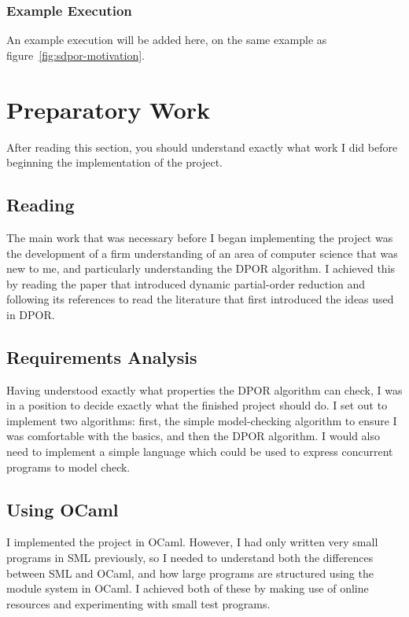 \documentclass[12pt,a4paper,twoside,openright]{report}
\begin{document}
\subsubsection{Example Execution}
An example execution will be added here, on the same example as
figure~\ref{fig:sdpor-motivation}.

\section{Preparatory Work}
After reading this section, you
should understand exactly what work I
did before beginning the implementation
of the project.

\subsection{Reading}

The main work that was necessary before
I began implementing the project was the
development of a firm understanding of an
area of computer science that was new to me,
and particularly understanding the DPOR algorithm.
I achieved this by reading the paper that
introduced dynamic partial-order reduction \cite{flan05}
and following
its references to read the literature that
first introduced the ideas used in DPOR.

\subsection{Requirements Analysis}
Having
understood exactly what properties the
DPOR algorithm can check, I was in a
position to decide exactly what the
finished project should do.
I set out to implement two algorithms:
first, the simple model-checking
algorithm to ensure I was comfortable
with the basics, and then the DPOR
algorithm. I would also need to
implement a simple language which
could be used to express concurrent
programs to model check.

\subsection{Using OCaml}
I implemented the project in OCaml.
However, I had only written very small
programs in SML previously, so I needed to
understand both the differences between
SML and OCaml, and how large programs
are structured using the module system
in OCaml. I achieved both of these
by making use of online resources and
experimenting with small test programs.
\end{document}
